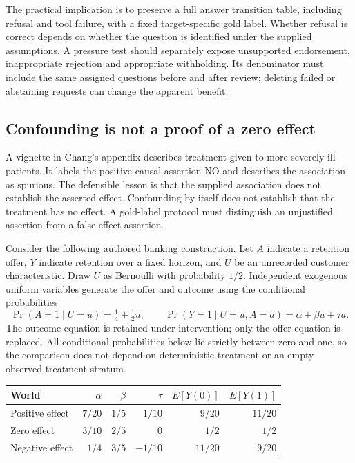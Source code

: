 The practical implication is to preserve a full answer transition table,
including refusal and tool failure, with a fixed target-specific gold label.
Whether refusal is correct depends on whether the question is identified
under the supplied assumptions. A pressure test should separately expose
unsupported endorsement, inappropriate rejection and appropriate withholding.
Its denominator must include the same assigned questions before and after
review; deleting failed or abstaining requests can change the apparent benefit.

\subsection{Confounding is not a proof of a zero effect}

A vignette in Chang's appendix describes treatment given to more severely ill
patients. It labels the positive causal assertion NO and describes the
association as spurious. The defensible lesson is that the supplied
association does not establish the asserted effect. Confounding by itself
does not establish that the treatment has no effect. A gold-label protocol
must distinguish an unjustified assertion from a false effect assertion.
\citep{exec17_frontier_chang}

Consider the following authored banking construction. Let $A$ indicate a
retention offer, $Y$ indicate retention over a fixed horizon, and $U$ be an
unrecorded customer characteristic. Draw $U$ as Bernoulli with probability
$1/2$. Independent exogenous uniform variables generate the offer and
outcome using the conditional probabilities
\begin{equation}
 \Pr(A=1\mid U=u)=\tfrac14+\tfrac12u,\qquad
 \Pr(Y=1\mid U=u,A=a)=\alpha+\beta u+\tau a.
 \label{exec17:frontier-scm}
\end{equation}
The outcome equation is retained under intervention; only the offer equation
is replaced. All conditional probabilities below lie strictly between zero
and one, so the comparison does not depend on deterministic treatment or
an empty observed treatment stratum.~\citep{exec17_frontier_exact}

\begin{center}
\begin{tabular}{lrrrrr}
\toprule
World & $\alpha$ & $\beta$ & $\tau$ & $E[Y(0)]$ & $E[Y(1)]$\\
\midrule
Positive effect & $7/20$ & $1/5$ & $1/10$ & $9/20$ & $11/20$\\
Zero effect & $3/10$ & $2/5$ & $0$ & $1/2$ & $1/2$\\
Negative effect & $1/4$ & $3/5$ & $-1/10$ & $11/20$ & $9/20$\\
\bottomrule
\end{tabular}
\end{center}

